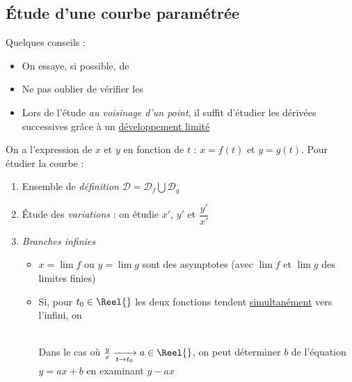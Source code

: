 \documentclass[11pt,a4paper,fleqn,pdftex]{report}
\begin{document}
\subsection{Étude d'une courbe paramétrée} %
\label{sub:etude_courbe_parametree}
\begin{methode}
Quelques conseils :
\begin{itemize}
	\item On essaye, si possible, de 
	\item Ne pas oublier de vérifier les 
	\item Lors de l'étude \emph{au voisinage d'un point}, il suffit d'étudier les dérivées successives grâce à un \uline{développement limité}
\end{itemize}
\end{methode}
On a l'expression de $x$ et $y$ en fonction de $t$ : $x = f(t)$ et $y = g(t)$. Pour étudier la courbe : 
\begin{enumerate}
    \item Ensemble de \emph{définition} $\mathcal{D} = \mathcal{D}_f \bigcup \mathcal{D}_g$
    \item Étude des \emph{variations} : on étudie $x'$, $y'$ et $\dfrac{y'}{x'}$
    \item \emph{Branches infinies} 
    	\begin{itemize}
    		\item $x = \lim f$ ou $y = \lim g$ sont des asymptotes (avec $\lim f$ et $\lim g$ des limites finies)
    		\item Si, pour $t_0 \in \Reel{}$ les deux fonctions tendent \uline{simultanément} vers l'infini, on 
    		\hfill \\
    		\begin{center}
			\end{center}
    		\hfill \\
    		Dans le cas où $\frac{y}{x} \xrightarrow[t \to t_0]{} a \in \Reel{}$, on peut déterminer $b$ de l'équation $y = ax + b$ en examinant $y - ax$
    	\end{itemize}
\end{enumerate}
\end{document}
